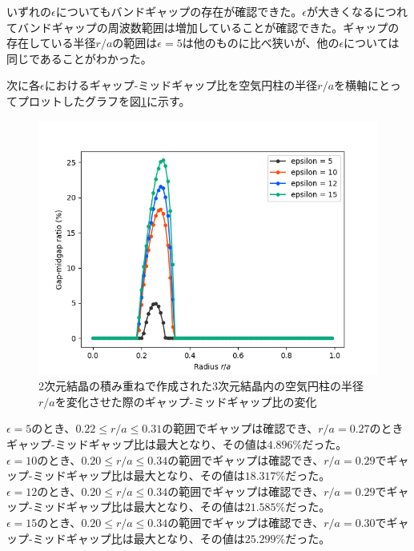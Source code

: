 \documentclass[platex,dvipdfmx]{jsreport}
\numberwithin{equation}{section}
\begin{document}
いずれの$\epsilon$についてもバンドギャップの存在が確認できた。$\epsilon$が大きくなるにつれてバンドギャップの周波数範囲は増加していることが確認できた。ギャップの存在している半径$r / a$の範囲は$\epsilon = 5$は他のものに比べ狭いが、他の$\epsilon$については同じであることがわかった。

次に各$\epsilon$におけるギャップ-ミッドギャップ比を空気円柱の半径$r / a$を横軸にとってプロットしたグラフを図\ref{fig:stack}に示す。 


\begin{figure}[htbp]
  \centering
  \includegraphics[width=0.8\linewidth]{results/gap_midgap_ratio/stack_crystals.png}
  \caption{2次元結晶の積み重ねで作成された3次元結晶内の空気円柱の半径$r / a$を変化させた際のギャップ-ミッドギャップ比の変化}
  \label{fig:stack}
\end{figure}

$\epsilon = 5$のとき、$0.22 \leq r / a \leq 0.31$の範囲でギャップは確認でき、$r / a = 0.27$のときギャップ-ミッドギャップ比は最大となり、その値は$4.896 \%$だった。\\
$\epsilon = 10$のとき、$0.20 \leq r / a \leq 0.34$の範囲でギャップは確認でき、$r / a = 0.29$でギャップ-ミッドギャップ比は最大となり、その値は$18.317 \%$だった。\\
$\epsilon = 12$のとき、$0.20 \leq r / a \leq 0.34$の範囲でギャップは確認でき、$r / a = 0.29$でギャップ-ミッドギャップ比は最大となり、その値は$21.585 \%$だった。\\
$\epsilon = 15$のとき、$0.20 \leq r / a \leq 0.34$の範囲でギャップは確認でき、$r / a = 0.30$でギャップ-ミッドギャップ比は最大となり、その値は$25.299 \%$だった。\\
\end{document}
